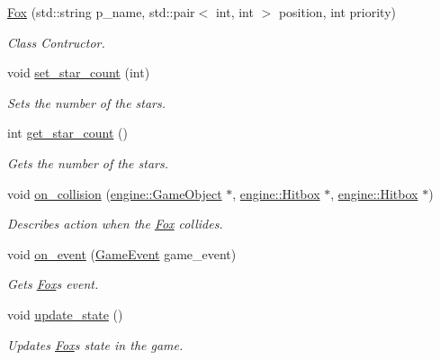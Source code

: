 \begin{DoxyCompactItemize}
\item 
\hyperlink{classmindscape_1_1_fox_a9c5e270000519e07ded5c549d16ad057}{Fox} (std\+::string p\+\_\+name, std\+::pair$<$ int, int $>$ position, int priority)
\begin{DoxyCompactList}\small\item\em Class Contructor. \end{DoxyCompactList}\item 
void \hyperlink{classmindscape_1_1_fox_a6ee5b7c313ccc0d08fbf51ffddd09e72}{set\+\_\+star\+\_\+count} (int)
\begin{DoxyCompactList}\small\item\em Sets the number of the stars. \end{DoxyCompactList}\item 
int \hyperlink{classmindscape_1_1_fox_af8dc5d2ee06af247f7de5c7f374f20e5}{get\+\_\+star\+\_\+count} ()
\begin{DoxyCompactList}\small\item\em Gets the number of the stars. \end{DoxyCompactList}\item 
void \hyperlink{classmindscape_1_1_fox_a29feec4478a5d1440cfd901417fec6eb}{on\+\_\+collision} (\hyperlink{classengine_1_1_game_object}{engine\+::\+Game\+Object} $\ast$, \hyperlink{classengine_1_1_hitbox}{engine\+::\+Hitbox} $\ast$, \hyperlink{classengine_1_1_hitbox}{engine\+::\+Hitbox} $\ast$)
\begin{DoxyCompactList}\small\item\em Describes action when the \hyperlink{classmindscape_1_1_fox}{Fox} collides. \end{DoxyCompactList}\item 
void \hyperlink{classmindscape_1_1_fox_a5a4a3bb811104e0f8e4e063bf5d1f3c4}{on\+\_\+event} (\hyperlink{class_game_event}{Game\+Event} game\+\_\+event)
\begin{DoxyCompactList}\small\item\em Gets \hyperlink{classmindscape_1_1_fox}{Fox}\textquotesingle{}s event. \end{DoxyCompactList}\item 
void \hyperlink{classmindscape_1_1_fox_aad5bf81351822350233f9da732db7cdd}{update\+\_\+state} ()
\begin{DoxyCompactList}\small\item\em Updates \hyperlink{classmindscape_1_1_fox}{Fox}\textquotesingle{}s state in the game. \end{DoxyCompactList}\item 

\end{DoxyCompactItemize}
